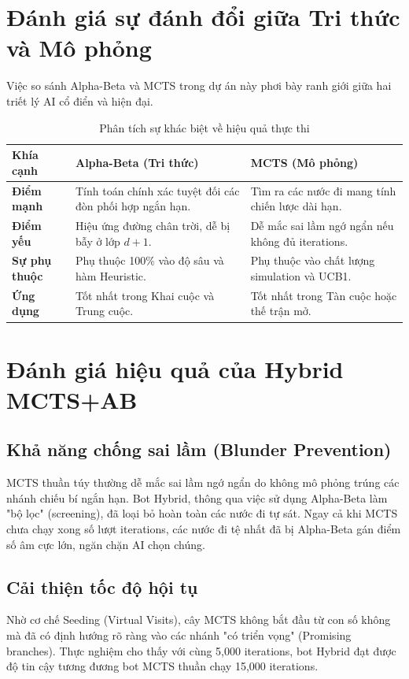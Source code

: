 \section{Đánh giá sự đánh đổi giữa Tri thức và Mô phỏng}

Việc so sánh Alpha-Beta và MCTS trong dự án này phơi bày ranh giới giữa hai triết lý AI cổ điển và hiện đại.

\begin{table}[H]
    \centering
    \caption{Phân tích sự khác biệt về hiệu quả thực thi}
    \label{tab:final_comparison}
    \begin{tabularx}{\textwidth}{|l|X|X|}
        \hline
        \textbf{Khía cạnh} & \textbf{Alpha-Beta (Tri thức)} & \textbf{MCTS (Mô phỏng)} \\ \hline
        \textbf{Điểm mạnh} & Tính toán chính xác tuyệt đối các đòn phối hợp ngắn hạn. & Tìm ra các nước đi mang tính chiến lược dài hạn. \\ \hline
        \textbf{Điểm yếu} & Hiệu ứng đường chân trời, dễ bị bẫy ở lớp $d+1$. & Dễ mắc sai lầm ngớ ngẩn nếu không đủ iterations. \\ \hline
        \textbf{Sự phụ thuộc} & Phụ thuộc 100\% vào độ sâu và hàm Heuristic. & Phụ thuộc vào chất lượng simulation và UCB1. \\ \hline
        \textbf{Ứng dụng} & Tốt nhất trong Khai cuộc và Trung cuộc. & Tốt nhất trong Tàn cuộc hoặc thế trận mở. \\ \hline
    \end{tabularx}
\end{table}

\section{Đánh giá hiệu quả của Hybrid MCTS+AB}

\subsection{Khả năng chống sai lầm (Blunder Prevention)}
MCTS thuần túy thường dễ mắc sai lầm ngớ ngẩn do không mô phỏng trúng các nhánh chiếu bí ngắn hạn. Bot Hybrid, thông qua việc sử dụng Alpha-Beta làm "bộ lọc" (screening), đã loại bỏ hoàn toàn các nước đi tự sát. Ngay cả khi MCTS chưa chạy xong số lượt iterations, các nước đi tệ nhất đã bị Alpha-Beta gán điểm số âm cực lớn, ngăn chặn AI chọn chúng.

\subsection{Cải thiện tốc độ hội tụ}
Nhờ cơ chế Seeding (Virtual Visits), cây MCTS không bắt đầu từ con số không mà đã có định hướng rõ ràng vào các nhánh "có triển vọng" (Promising branches). Thực nghiệm cho thấy với cùng 5,000 iterations, bot Hybrid đạt được độ tin cậy tương đương bot MCTS thuần chạy 15,000 iterations.


